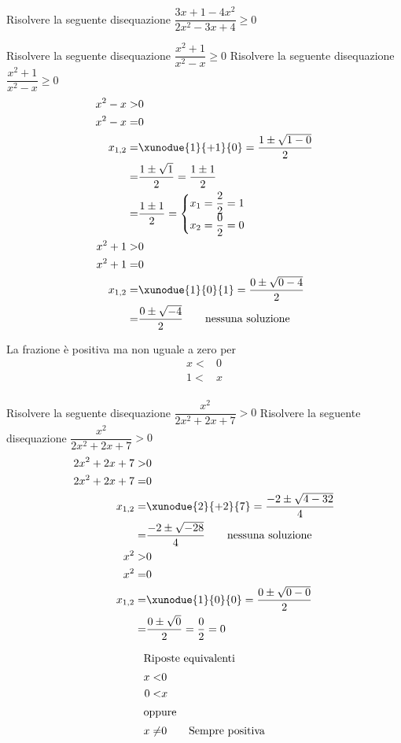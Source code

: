 \begin{exercise}[no solution]
		Risolvere la seguente disequazione $\dfrac{3x+1-4x^2}{2x^2-3x+4}\geq 0$
\end{exercise}
\begin{exercise}
		Risolvere la seguente disequazione $\dfrac{x^2+1}{x^2-x}\geq0$
	\tcblower
	Risolvere la seguente disequazione $\dfrac{x^2+1}{x^2-x}\geq0$	
\begin{align*}
x^2-x>&0\\
x^2-x=&0\\
x_{1,2}=&\xunodue{1}{+1}{0}=\dfrac{1\pm\sqrt{1-0}}{2}\\
=&\dfrac{1\pm\sqrt{1}}{2}=\dfrac{1\pm 1}{2}\\
=&\dfrac{1\pm 1}{2}=\begin{cases}
	x_1=\dfrac{2}{2}=1\\
	x_2=\dfrac{0}{2}=0
\end{cases}\\
x^2+1>&0\\
x^2+1=&0\\
x_{1,2}=&\xunodue{1}{0}{1}=\dfrac{0\pm\sqrt{0-4}}{2}\\
=&\dfrac{0\pm\sqrt{-4}}{2}
\qquad\text{nessuna soluzione}\\
\end{align*}
\begin{center}

\end{center}
La frazione è positiva ma non uguale a zero per
\begin{align*}
x<&0\\ 1<&x\\
\end{align*}
\end{exercise}
\begin{exercise}
		Risolvere la seguente disequazione $\dfrac{x^2}{2x^2+2x+7}> 0$
	\tcblower
		Risolvere la seguente disequazione $\dfrac{x^2}{2x^2+2x+7}> 0$
	\begin{align*}
	2x^2+2x+7>&0\\
	2x^2+2x+7=&0\\
	x_{1,2}=&\xunodue{2}{+2}{7}=\dfrac{-2\pm\sqrt{4-32}}{4}\\
	=&\dfrac{-2\pm\sqrt{-28}}{4}
	\qquad\text{nessuna soluzione}\\
	x^2>&0\\
	x^2=&0\\
	x_{1,2}=&\xunodue{1}{0}{0}=\dfrac{0\pm\sqrt{0-0}}{2}\\
	=&\dfrac{0\pm\sqrt{0}}{2}=\dfrac{0}{2}=0\\
	\end{align*}
	\begin{center}
		
	\end{center}	
		\begin{align*}
		\intertext{Riposte equivalenti}
		x<&0\\ 0<&x\\
		\intertext{oppure}
		x\neq&0\qquad\text{Sempre positiva}
		\end{align*}
\end{exercise}
